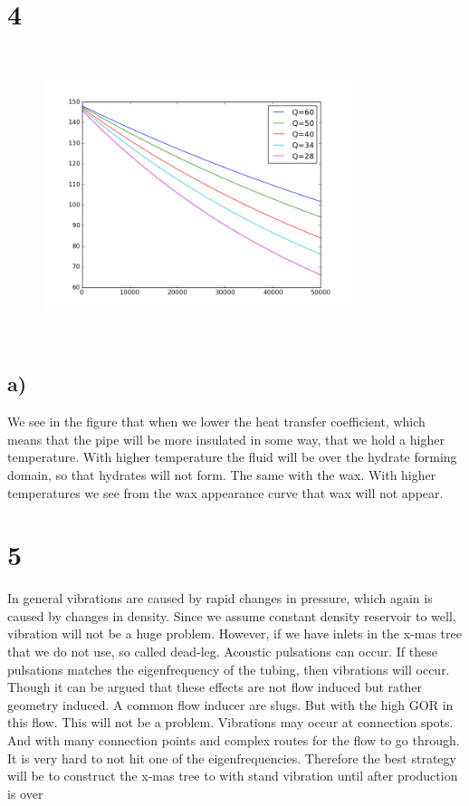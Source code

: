 \documentclass[DIV=calc, paper=a4, fontsize=13pt, twocolumn]{scrartcl}	 %
\begin{document}
\section*{4}
\begin{figure}[h]
\includegraphics[width=9cm,height=8.5cm]{Temp_insulated.png}
\end{figure}
\subsection*{a)}
We see in the figure that when we lower the heat transfer coefficient, which means that the pipe will be more insulated in some way, that we hold a higher temperature. With higher temperature the fluid will be over the hydrate forming domain, so that hydrates will not form. The same with the wax. With higher temperatures we see from the wax appearance curve that wax will not appear.

\section*{5}
In general vibrations are caused by rapid changes in pressure, which again is caused by changes in density. Since we assume constant density reservoir to well, vibration will not be a huge problem.
\newline
However, if we have inlets in the x-mas tree that we do not use, so called dead-leg. Acoustic pulsations can occur. If these pulsations matches the eigenfrequency of the tubing, then vibrations will occur. Though it can be argued that these effects are not flow induced but rather geometry induced. 
\newline
A common flow inducer are slugs. But with the high GOR in this flow. This will not be a problem. 
\newline
Vibrations may occur at connection spots. And with many connection points and complex routes for the flow to go through. It is very hard to not hit one of the eigenfrequencies. Therefore the best strategy will be to construct the x-mas tree to with stand vibration until after production is over  
\end{document}
